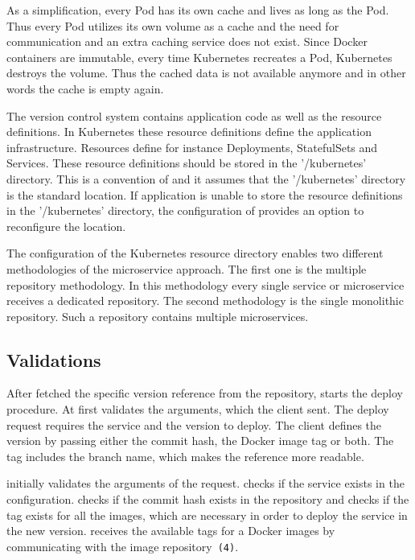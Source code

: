 As a simplification, every Pod has its own cache and lives as long as the Pod. Thus every
Pod utilizes its own volume as a cache and the need for communication and an extra caching
service does not exist. Since Docker containers are immutable, every time Kubernetes
recreates a Pod, Kubernetes destroys the volume. Thus the cached data is not available
anymore and in other words the cache is empty again.

The version control system contains application code as well as the resource
definitions. In Kubernetes these resource definitions define the application
infrastructure. Resources define for instance Deployments, StatefulSets and
Services. These resource definitions should be stored in the '/kubernetes' directory. This
is a convention of \deployer and it assumes that the '/kubernetes' directory is the
standard location. If application is unable to store the resource definitions in the
'/kubernetes' directory, the configuration of \deployer provides an option to reconfigure
the location.

The configuration of the Kubernetes resource directory enables two different methodologies
of the microservice approach. The first one is the multiple repository methodology. In
this methodology every single service or microservice receives a dedicated repository.
The second methodology is the single monolithic repository. Such a repository contains
multiple microservices.

\subsection{Validations}

After \deployer fetched the specific version reference from the repository, \deployer starts
the deploy procedure. At first \deployer validates the arguments, which the client
sent. The deploy request requires the service and the version to deploy. The client
defines the version by passing either the commit hash, the Docker image tag or both. The
tag includes the branch name, which makes the reference more readable.

\deployer initially validates the arguments of the request. \deployer checks if the service
exists in the configuration. \deployer checks if the commit hash exists in the repository
and \deployer checks if the tag exists for all the images, which are necessary in order to
deploy the service in the new version. \deployer receives the available tags for a Docker
images by communicating with the image repository~\texttt{(4)}.

